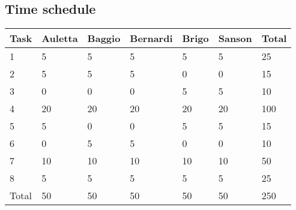 \documentclass[12pt]{article}
\begin{document}
\subsection{Time schedule}
\begin{center}
    \begin{tabular}{ |p{1.5cm}|p{1.5cm}|p{1.5cm}|p{1.5cm}|p{1.5cm}|p{1.5cm}|p{1.5cm}|}
        \hline
        Task & Auletta & Baggio & Bernardi & Brigo & Sanson & Total\\
        \hline
        1 & 5 & 5 & 5 & 5 & 5 & 25 \\
        \hline
        2 & 5 & 5 & 5 & 0 & 0 & 15 \\
        \hline
        3 & 0 & 0 & 0 & 5 & 5 & 10 \\
        \hline
        4 & 20 & 20 & 20 & 20 & 20 & 100 \\
        \hline
        5 & 5 & 0 & 0 & 5 & 5 & 15 \\
        \hline
        6 & 0 & 5 & 5 & 0 & 0 & 10 \\
        \hline
        7 & 10 & 10 & 10 & 10 & 10 & 50 \\
        \hline
        8 & 5 & 5 & 5 & 5 & 5 & 25 \\
        \hline
        Total & 50 & 50 & 50 & 50 & 50 & 250 \\
        \hline
    \end{tabular}
\end{center}
\newpage
\end{document}
